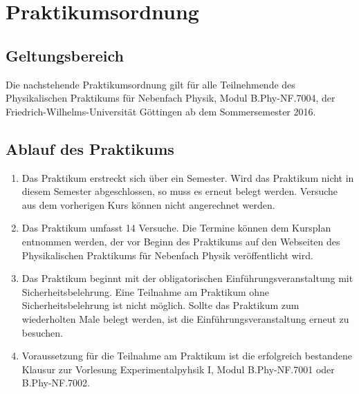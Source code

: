 \chapter*{Praktikumsordnung} \label{v:ordnung}

\section{Geltungsbereich}

Die nachstehende Praktikumsordnung gilt für alle Teilnehmende des Physikalischen Praktikums für Nebenfach Physik, Modul B.Phy-NF.7004, der Friedrich-Wilhelms-Universität Göttingen ab dem Sommersemester 2016.

\section{Ablauf des Praktikums}

\begin{enumerate}
	\item Das Praktikum erstreckt sich über ein Semester. Wird das Praktikum nicht in diesem Semester abgeschlossen, so muss es erneut belegt werden. Versuche aus dem vorherigen Kurs können nicht angerechnet werden.
	\item Das Praktikum umfasst 14 Versuche. Die Termine können dem Kursplan entnommen werden, der vor Beginn des Praktikums auf den Webseiten des Physikalischen Praktikums für Nebenfach Physik veröffentlicht wird.
	\item Das Praktikum beginnt mit der obligatorischen Einführungsveranstaltung mit Sicherheitsbelehrung. Eine Teilnahme am Praktikum ohne Sicherheitsbelehrung ist nicht möglich. Sollte das Praktikum zum wiederholten Male belegt werden, ist die Einführungsveranstaltung erneut zu besuchen.
	\item Voraussetzung für die Teilnahme am Praktikum ist die erfolgreich bestandene Klausur zur Vorlesung Experimentalpyhsik I, Modul B.Phy-NF.7001 oder B.Phy-NF.7002.
\end{enumerate}

\section{}